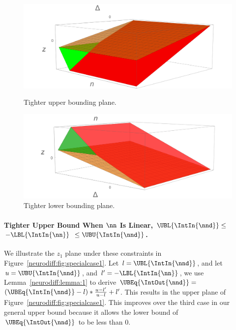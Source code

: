 \begin{figure}
	\centering
	\begin{minipage}[t]{0.45\linewidth}
		\centering
		\includegraphics[width=\linewidth]{neurodiff/figs/specialcase1.png}
		\caption{Tighter upper bounding plane.}
		\label{neurodiff:fig:specialcase1}
	\end{minipage}%
	\hspace{0.09\linewidth}
	\begin{minipage}[t]{0.45\linewidth}
		\centering
		\includegraphics[width=\linewidth]{neurodiff/figs/specialcase2.png}
		\caption{Tighter lower bounding plane.}
		\label{neurodiff:fig:specialcase2}
	\end{minipage}
\end{figure}
%
%

\paragraph{Tighter Upper Bound When $ \nn $ Is Linear, $ \UBL{\IntIn{\nnd}}
\leq $  $-\LBL{\IntIn{\nn}} $ $ \leq \UBU{\IntIn{\nnd}} $.}
We illustrate the $ z_1 $ plane under these constraints in
Figure~\ref{neurodiff:fig:specialcase1}.
Let $ l = \UBL{\IntIn{\nnd}} $, and let $ u = \UBU{\IntIn{\nnd}} $, and $ l' =
-\LBL{\IntIn{\nn}} $, we use Lemma~\ref{neurodiff:lemma:1} to derive
$ \UBEq{\IntOut{\nnd}} =$ $ (\UBEq{\IntIn{\nnd}} - l)*\frac{u - l'}{u
- l} + l' $. This results in the upper plane of
Figure~\ref{neurodiff:fig:specialcase1}.
This improves over the third case in our general upper
bound because it allows the lower bound of $ \UBEq{\IntOut{\nnd}} $ to
be less than 0.


